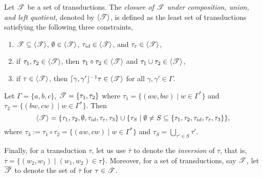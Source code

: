 \begin{definition}
Let ${\mathscr{T} }$ be a set of transductions. The \emph{closure of ${\mathscr{T} }$ under composition, union, and left quotient}, denoted by $\langle{\mathscr{T} } \rangle $, is defined as the least set of transductions satisfying the following three constraints,
\begin{enumerate}
    \item ${\mathscr{T} } \subseteq \langle{\mathscr{T} } \rangle $, $\emptyset \in \langle{\mathscr{T} } \rangle $, $\tau_{id} \in \langle{\mathscr{T} } \rangle $, and $\tau_{\varepsilon} \in \langle{\mathscr{T} } \rangle $,
%
    \item if $\tau_1, \tau_2 \in \langle{\mathscr{T} } \rangle $, then $\tau_1 \circ \tau_2 \in \langle{\mathscr{T} } \rangle $ and $\tau_1 \cup \tau_2 \in \langle{\mathscr{T} } \rangle $,
%
    \item if $\tau \in \langle{\mathscr{T} } \rangle $, then $\lceil \gamma, \gamma' \rfloor^{-1} \tau \in \langle{\mathscr{T} } \rangle $ for all $\gamma, \gamma' \in \Gamma$.
\end{enumerate}
\end{definition}

\begin{example}
Let $\Gamma = \{a, b, c\}$, ${\mathscr{T} } = \{\tau_1, \tau_2\}$ where $\tau_1 = \{(aw, bw) \mid w \in \Gamma^*\}$ and $\tau_2 = \{(bw, cw) \mid w \in \Gamma^*\}$. Then 
$$\langle {\mathscr{T} } \rangle = \{\tau_1, \tau_2, \emptyset, \tau_{id}, \tau_\varepsilon, \tau_3\} \cup  \{\tau_S \mid \emptyset \neq S \subseteq \{\tau_1, \tau_2, \tau_{id}, \tau_\varepsilon, \tau_3\} \},$$
where $\tau_3 := \tau_1 \circ \tau_2 = \{(aw, cw) \mid w \in \Gamma^*\}$ and $\tau_S = \bigcup \limits_{\tau' \in S} \tau'$. 
\end{example}

Finally, for a transduction $\tau$, let us use $\overline{\tau}$ to denote the \emph{inversion} of $\tau$, that is, $\overline{\tau} = \{(w_2, w_1) \mid (w_1, w_2) \in \tau\}$. Moreover, for a set of transductions, say ${\mathscr{T} }$, let $\overline{{\mathscr{T} }}$ to denote the set of $\overline{\tau}$ for $\tau \in {\mathscr{T} }$.  

